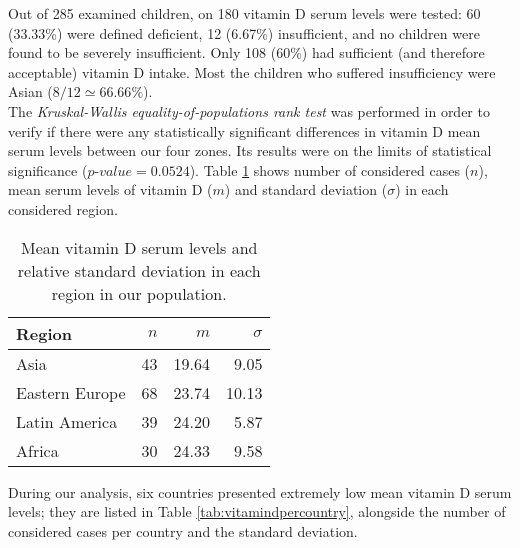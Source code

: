 
Out of 285 examined children, on 180 vitamin D serum levels were tested: 60 (33.33\%) were defined deficient, 12 (6.67\%) insufficient, and no children were found to be severely insufficient. Only 108 (60\%) had sufficient (and therefore acceptable) vitamin D intake. Most the children who suffered insufficiency were Asian ($8/12\simeq66.66\%$).\\
The \textit{Kruskal-Wallis equality-of-populations rank test} was performed in order to verify if there were any statistically significant differences in vitamin D mean serum levels between our four zones. Its results were on the limits of statistical significance ($p$-$value=0.0524$). Table \ref{tab:vitamindperregion} shows number of considered cases ($n$), mean serum levels of vitamin D ($m$) and standard deviation ($\sigma$) in each considered region.

\begin{table}[H]
   \centering
   \begin{tabular}{l r r r}
      Region\footnotemark[2] & $n$ & $m$ & $\sigma$\\
      \hline
      Asia & 43 & 19.64 & 9.05\\
      Eastern Europe & 68 & 23.74 & 10.13\\
      Latin America & 39 & 24.20 & 5.87\\
      Africa & 30 & 24.33 & 9.58\\
   \end{tabular}
   \caption{Mean vitamin D serum levels and relative standard deviation in each region in our population.}
    \label{tab:vitamindperregion}
\end{table}


During our analysis, six countries presented extremely low mean vitamin D serum levels; they are listed in Table \ref{tab:vitamindpercountry}, alongside the number of considered cases per country and the standard deviation.

